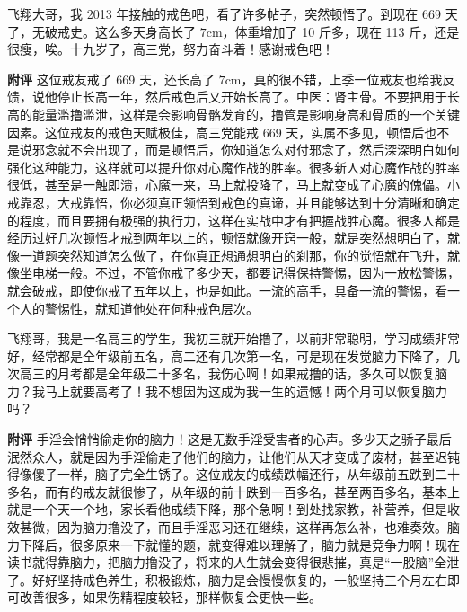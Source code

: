 \begin{case}
    飞翔大哥，我 2013 年接触的戒色吧，看了许多帖子，突然顿悟了。到现在 669 天了，无破戒史。这么多天身高长了 $7 \unit{\cm}$，体重增加了 10 斤多，现在 113 斤，还是很瘦，唉。十九岁了，高三党，努力奋斗着！感谢戒色吧！

    \textbf{附评} 这位戒友戒了 669 天，还长高了 $7 \unit{\cm}$，真的很不错，上季一位戒友也给我反馈，说他停止长高一年，然后戒色后又开始长高了。中医：肾主骨。不要把用于长高的能量滥撸滥泄，这样是会影响骨骼发育的，撸管是影响身高和骨质的一个关键因素。这位戒友的戒色天赋极佳，高三党能戒 669 天，实属不多见，顿悟后也不是说邪念就不会出现了，而是顿悟后，你知道怎么对付邪念了，然后深深明白如何强化这种能力，这样就可以提升你对心魔作战的胜率。很多新人对心魔作战的胜率很低，甚至是一触即溃，心魔一来，马上就投降了，马上就变成了心魔的傀儡。小戒靠忍，大戒靠悟，你必须真正领悟到戒色的真谛，并且能够达到十分清晰和确定的程度，而且要拥有极强的执行力，这样在实战中才有把握战胜心魔。很多人都是经历过好几次顿悟才戒到两年以上的，顿悟就像开窍一般，就是突然想明白了，就像一道题突然知道怎么做了，在你真正想通想明白的刹那，你的觉悟就在飞升，就像坐电梯一般。不过，不管你戒了多少天，都要记得保持警惕，因为一放松警惕，就会破戒，即使你戒了五年以上，也是如此。一流的高手，具备一流的警惕，看一个人的警惕性，就知道他处在何种戒色层次。
\end{case}

\begin{case}
    飞翔哥，我是一名高三的学生，我初三就开始撸了，以前非常聪明，学习成绩非常好，经常都是全年级前五名，高二还有几次第一名，可是现在发觉脑力下降了，几次高三的月考都是全年级二十多名，我伤心啊！如果戒撸的话，多久可以恢复脑力？我马上就要高考了！我不想因为这成为我一生的遗憾！两个月可以恢复脑力吗？

    \textbf{附评} 手淫会悄悄偷走你的脑力！这是无数手淫受害者的心声。多少天之骄子最后泯然众人，就是因为手淫偷走了他们的脑力，让他们从天才变成了废材，甚至迟钝得像傻子一样，脑子完全生锈了。这位戒友的成绩跌幅还行，从年级前五跌到二十多名，而有的戒友就很惨了，从年级的前十跌到一百多名，甚至两百多名，基本上就是一个天一个地，家长看他成绩下降，那个急啊！到处找家教，补营养，但是收效甚微，因为脑力撸没了，而且手淫恶习还在继续，这样再怎么补，也难奏效。脑力下降后，很多原来一下就懂的题，就变得难以理解了，脑力就是竞争力啊！现在读书就得靠脑力，把脑力撸没了，将来的人生就会变得很悲摧，真是“一股脑”全泄了。好好坚持戒色养生，积极锻炼，脑力是会慢慢恢复的，一般坚持三个月左右即可改善很多，如果伤精程度较轻，那样恢复会更快一些。
\end{case}

